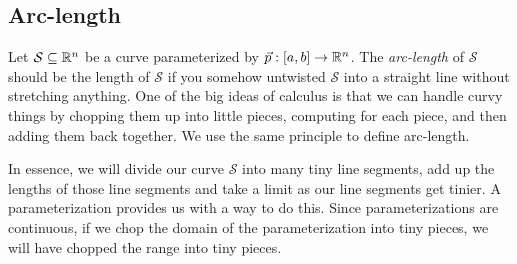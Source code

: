 \subsection{Arc-length}
Let $\mathcal S\subseteq \mathbb{R}^n$ be a curve parameterized by $\vec p:[a,b]\to\mathbb{R}^n$.  
The \emph{arc-length} of $\mathcal S$
should be the length of $\mathcal S$ if you somehow untwisted $\mathcal S$ into a straight
line without stretching anything.  One of the big ideas of calculus is that 
we can handle curvy things by chopping them up into little pieces, computing
for each piece, and then adding them back together.  We use the same principle 
to define arc-length.

In essence, we will divide our curve $\mathcal S$ into many tiny line segments,
add up the lengths of those line segments and take a limit as our line segments
get tinier.  A parameterization provides us with a way to do this.  Since parameterizations
are continuous, if we chop the domain of the parameterization into tiny pieces,
we will have chopped the range into tiny pieces.


%

